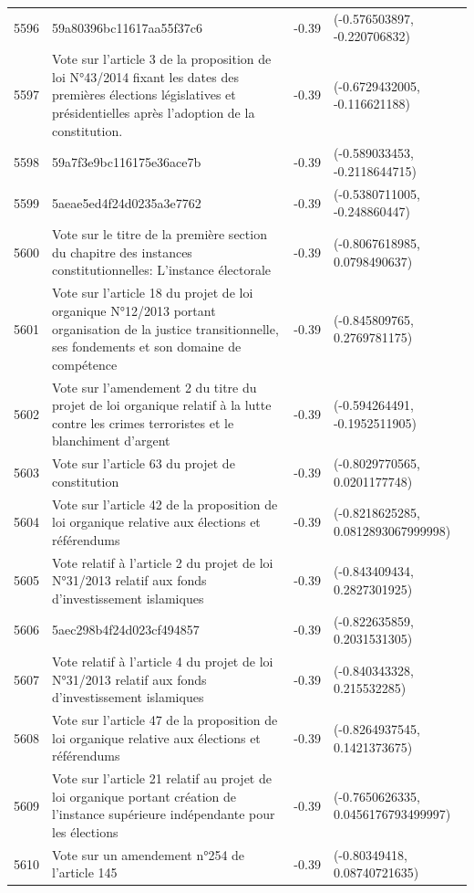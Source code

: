\begin{table}[ht]
\begin{tabular}{rlrl}
  5596 & 59a80396bc11617aa55f37c6 & -0.39 & (-0.576503897, -0.220706832) \\ 
  5597 & Vote sur l'article 3 de la proposition de loi N°43/2014 fixant les dates des premières élections législatives et présidentielles après l'adoption de la constitution. & -0.39 & (-0.6729432005, -0.116621188) \\ 
  5598 & 59a7f3e9bc116175e36ace7b & -0.39 & (-0.589033453, -0.2118644715) \\ 
  5599 & 5aeae5ed4f24d0235a3e7762 & -0.39 & (-0.5380711005, -0.248860447) \\ 
  5600 & Vote sur le titre de la première section du chapitre des instances constitutionnelles: L'instance électorale & -0.39 & (-0.8067618985, 0.0798490637) \\ 
  5601 & Vote sur l'article 18 du projet de loi organique N°12/2013 portant organisation de la justice transitionnelle, ses fondements et son domaine de compétence & -0.39 & (-0.845809765, 0.2769781175) \\ 
  5602 & Vote sur l'amendement 2 du titre du projet de loi organique relatif à la lutte contre les crimes terroristes et le blanchiment d'argent & -0.39 & (-0.594264491, -0.1952511905) \\ 
  5603 & Vote sur l'article 63 du projet de constitution & -0.39 & (-0.8029770565, 0.0201177748) \\ 
  5604 & Vote sur l'article 42 de la proposition de loi organique relative aux élections et référendums & -0.39 & (-0.8218625285, 0.0812893067999998) \\ 
  5605 & Vote relatif à l'article 2 du projet de loi N°31/2013 relatif aux fonds d'investissement islamiques & -0.39 & (-0.843409434, 0.2827301925) \\ 
  5606 & 5aec298b4f24d023cf494857 & -0.39 & (-0.822635859, 0.2031531305) \\ 
  5607 & Vote relatif à l'article 4 du projet de loi N°31/2013 relatif aux fonds d'investissement islamiques & -0.39 & (-0.840343328, 0.215532285) \\ 
  5608 & Vote sur l'article 47 de la proposition de loi organique relative aux élections et référendums & -0.39 & (-0.8264937545, 0.1421373675) \\ 
  5609 & Vote sur l'article 21 relatif au projet de loi organique portant création de l'instance supérieure indépendante pour les élections & -0.39 & (-0.7650626335, 0.0456176793499997) \\ 
  5610 & Vote sur un amendement n°254 de l'article 145 & -0.39 & (-0.80349418, 0.08740721635) \\ 

\end{tabular}
\end{table}
